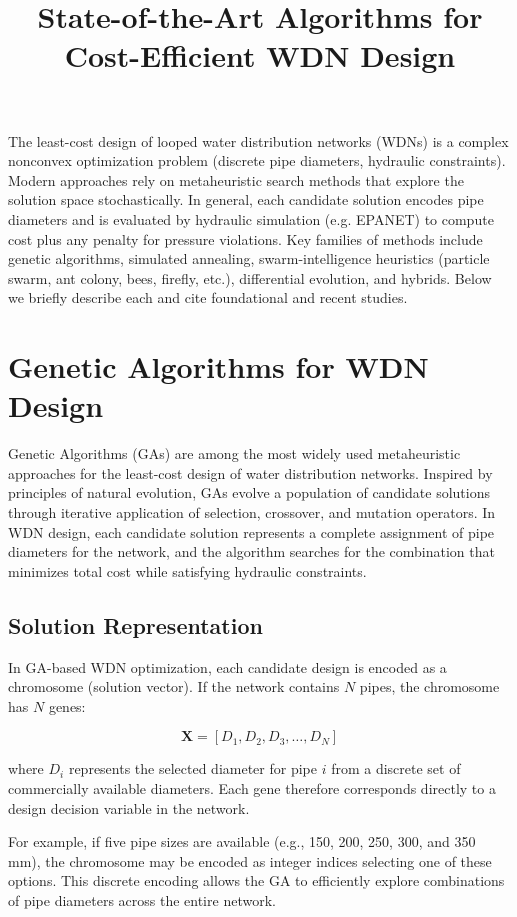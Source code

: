 \documentclass[12pt, a4paper]{article}
\title{State-of-the-Art Algorithms for Cost-Efficient WDN Design}
\date{}
\author{}
\begin{document}
\maketitle

The least-cost design of looped water distribution networks (WDNs) is a complex nonconvex optimization problem (discrete pipe diameters, hydraulic constraints). Modern approaches rely on metaheuristic search methods that explore the solution space stochastically. In general, each candidate solution encodes pipe diameters and is evaluated by hydraulic simulation (e.g. EPANET) to compute cost plus any penalty for pressure violations. Key families of methods include genetic algorithms, simulated annealing, swarm-intelligence heuristics (particle swarm, ant colony, bees, firefly, etc.), differential evolution, and hybrids. Below we briefly describe each and cite foundational and recent studies.

\section*{Genetic Algorithms for WDN Design}

Genetic Algorithms (GAs) are among the most widely used metaheuristic approaches for the least-cost design of water distribution networks. Inspired by principles of natural evolution, GAs evolve a population of candidate solutions through iterative application of selection, crossover, and mutation operators. In WDN design, each candidate solution represents a complete assignment of pipe diameters for the network, and the algorithm searches for the combination that minimizes total cost while satisfying hydraulic constraints.

\subsection*{Solution Representation}

In GA-based WDN optimization, each candidate design is encoded as a chromosome (solution vector). If the network contains $N$ pipes, the chromosome has $N$ genes:

\[
	\mathbf{X} = [D_1, D_2, D_3, \dots, D_N]
\]

where $D_i$ represents the selected diameter for pipe $i$ from a discrete set of commercially available diameters. Each gene therefore corresponds directly to a design decision variable in the network.

For example, if five pipe sizes are available (e.g., 150, 200, 250, 300, and 350 mm), the chromosome may be encoded as integer indices selecting one of these options. This discrete encoding allows the GA to efficiently explore combinations of pipe diameters across the entire network.
\end{document}
